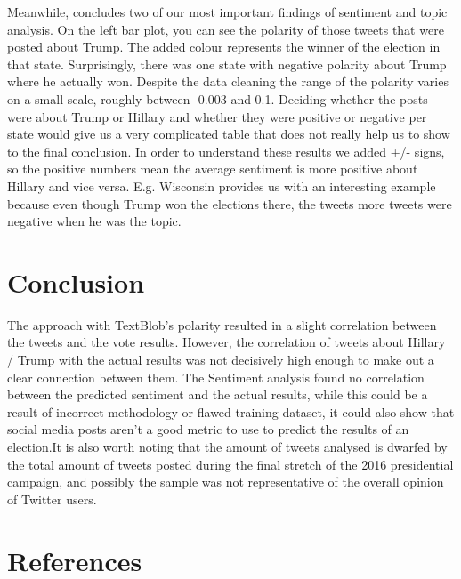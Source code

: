 \documentclass{article}
\begin{document}

  \begin{wrapfigure}{r}{0.79\linewidth}
    \vspace{-80pt}
    \begin{center}
      \texttt{[image: \{sentiment\_states.jpeg]}}
    \end{center}
    \vspace{-20pt}
    \captionsetup{justification=centering}
    \caption{Conclusive Data Visualisation after Sentiment and Topic Analysis} 
    \label{fig:sentiment_states}
    \vspace{-60pt}
  \end{wrapfigure}
  
  Meanwhile,  concludes two of our most
  important findings of sentiment and topic analysis. On the left bar
  plot, you can see the polarity of those tweets that were posted
  about Trump. The added colour represents the winner of the election
  in that state. Surprisingly, there was one state with negative
  polarity about Trump where he actually won. Despite the data
  cleaning the range of the polarity varies on a small scale, roughly
  between -0.003 and 0.1. Deciding whether the posts were about Trump
  or Hillary and whether they were positive or negative per state
  would give us a very complicated table that does not really help us
  to show to the final conclusion. In order to understand these
  results we added +/- signs, so the positive numbers mean the average
  sentiment is more positive about Hillary and vice
  versa. E.g. Wisconsin provides us with an interesting example
  because even though Trump won the elections there, the tweets more
  tweets were negative when he was the topic.  
  
  \section{Conclusion}
  The approach with TextBlob’s polarity resulted in a slight
  correlation between the tweets and the vote results. However, the
  correlation of tweets about Hillary / Trump with the actual results
  was not decisively high enough to make out a clear connection
  between them. The Sentiment analysis found no correlation between
  the predicted sentiment and the actual results, while this could be
  a result of incorrect methodology or flawed training dataset, it
  could also show that social media posts aren’t a good metric to use
  to predict the results of an election.It is also worth noting that
  the amount of tweets analysed is dwarfed by the total amount of
  tweets posted during the final stretch of the 2016 presidential
  campaign, and possibly the sample was not representative of the
  overall opinion of Twitter users.
  

  \newpage
  \section{References}
  \nocite{*}
  \setlength{}
  \printbibliography[heading=none]
  
  
\end{document}
